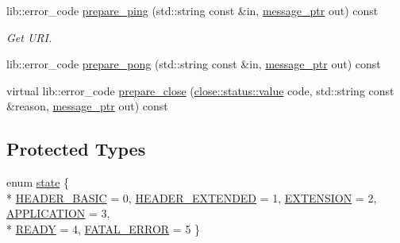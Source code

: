 \begin{DoxyCompactItemize}
lib\+::error\+\_\+code \hyperlink{classwebsocketpp_1_1processor_1_1hybi13_aefff38de2ab11050296fe90e85c37cd1}{prepare\+\_\+ping} (std\+::string const \&in, \hyperlink{classwebsocketpp_1_1processor_1_1hybi13_a0571e90d7261ab722f695feb7dd48fed}{message\+\_\+ptr} out) const 
\begin{DoxyCompactList}\small\item\em Get U\+R\+I. \end{DoxyCompactList}\item 
lib\+::error\+\_\+code \hyperlink{classwebsocketpp_1_1processor_1_1hybi13_a8fe1a1fe8a2506263d5dcb9a9b106b04}{prepare\+\_\+pong} (std\+::string const \&in, \hyperlink{classwebsocketpp_1_1processor_1_1hybi13_a0571e90d7261ab722f695feb7dd48fed}{message\+\_\+ptr} out) const 
\item 
virtual lib\+::error\+\_\+code \hyperlink{classwebsocketpp_1_1processor_1_1hybi13_abd0b741b8cea11a72e71b924258bdd1e}{prepare\+\_\+close} (\hyperlink{namespacewebsocketpp_1_1close_1_1status_a8614a5c4733d708e2d2a32191c5bef84}{close\+::status\+::value} code, std\+::string const \&reason, \hyperlink{classwebsocketpp_1_1processor_1_1hybi13_a0571e90d7261ab722f695feb7dd48fed}{message\+\_\+ptr} out) const 
\end{DoxyCompactItemize}
\subsection*{Protected Types}
\begin{DoxyCompactItemize}
\item 
enum \hyperlink{classwebsocketpp_1_1processor_1_1hybi13_a56fee5ffbb0b5c2c0708be2338e0740d}{state} \{ \\*
\hyperlink{classwebsocketpp_1_1processor_1_1hybi13_a56fee5ffbb0b5c2c0708be2338e0740da5441abed66bcf688fd3559c9bbcd96be}{H\+E\+A\+D\+E\+R\+\_\+\+B\+A\+S\+I\+C} = 0, 
\hyperlink{classwebsocketpp_1_1processor_1_1hybi13_a56fee5ffbb0b5c2c0708be2338e0740dae879a8fa0050cadae746a7224211bac5}{H\+E\+A\+D\+E\+R\+\_\+\+E\+X\+T\+E\+N\+D\+E\+D} = 1, 
\hyperlink{classwebsocketpp_1_1processor_1_1hybi13_a56fee5ffbb0b5c2c0708be2338e0740da79680e4ca9eec48fcb1160dacfedcd04}{E\+X\+T\+E\+N\+S\+I\+O\+N} = 2, 
\hyperlink{classwebsocketpp_1_1processor_1_1hybi13_a56fee5ffbb0b5c2c0708be2338e0740daeddf9b6b1b18ba9e7ee43b77569a200c}{A\+P\+P\+L\+I\+C\+A\+T\+I\+O\+N} = 3, 
\\*
\hyperlink{classwebsocketpp_1_1processor_1_1hybi13_a56fee5ffbb0b5c2c0708be2338e0740da566338b5150068fe319a1159ab395c8a}{R\+E\+A\+D\+Y} = 4, 
\hyperlink{classwebsocketpp_1_1processor_1_1hybi13_a56fee5ffbb0b5c2c0708be2338e0740da1af24a6840fa5af96e4a1e15e930d617}{F\+A\+T\+A\+L\+\_\+\+E\+R\+R\+O\+R} = 5
 \}
\end{DoxyCompactItemize}
